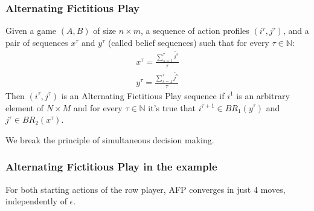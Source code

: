 \documentclass[pdf]{beamer}
\newcommand{\pstrat}{\widetilde}
\begin{document}
\begin{frame}
    \frametitle{Alternating Fictitious Play}
    \begin{definition} \label{def:fp:berger}
        Given a game $(A, B)$  of size $n \times m$, a sequence of action profiles $(i^\tau, j^\tau)$, and a pair of sequences $x^\tau$ and $y^\tau$ (called belief sequences) such that for every $\tau \in \mathbb{N}$:
        \begin{gather*}
            x^\tau= \frac{\sum^\tau_{s=1} \pstrat{i^s}}{\tau}  \\
            y^\tau= \frac{\sum^\tau_{s=1} \pstrat{j^s}}{\tau}
        \end{gather*}
        Then $(i^\tau, j^\tau)$ is an Alternating Fictitious Play sequence if $i^1$ is an arbitrary element of $N \times M$ and for every $\tau \in \mathbb{N}$ it's true that $i^{\tau+1} \in BR_1(y^\tau)$ and $j^{\tau} \in BR_2(x^\tau)$.
    \end{definition}
    \pause We break the principle of simultaneous decision making.

\end{frame}

\begin{frame}
    \frametitle{Alternating Fictitious Play in the example}

    For both starting actions of the row player, AFP converges in just 4 moves, independently of $\epsilon$.
    

\end{frame}
\end{document}
